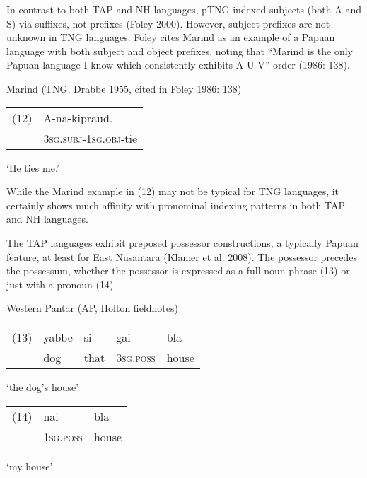 In contrast to both TAP and NH languages, pTNG indexed subjects (both A and S) via suffixes, not prefixes (Foley 2000). However, subject prefixes are not unknown in TNG languages. Foley cites Marind as an example of a Papuan language with both subject and object prefixes, noting that {\textquotedblleft}Marind is the only Papuan language I know which consistently exhibits A-U-V{\textquotedblright} order (1986: 138). 

Marind (TNG, Drabbe 1955, cited in Foley 1986: 138)

\begin{flushleft}
\tablehead{}
\begin{supertabular}{m{0.48795983in}m{1.5948598in}}
(12) &
A-na-kipraud.\\
 &
3\textsc{sg.subj-1sg.obj-}tie\\
\end{supertabular}
\end{flushleft}
{\textquoteleft}He ties me.{\textquoteright}  

While the Marind example in (12) may not be typical for TNG languages, it certainly shows much affinity with pronominal indexing patterns in both TAP and NH languages. 

The TAP languages exhibit preposed possessor constructions, a typically Papuan feature, at least for East Nusantara (Klamer et al. 2008). The possessor precedes the possessum, whether the possessor is expressed as a full noun phrase (13) or just with a pronoun (14).

Western Pantar (AP, Holton fieldnotes)

\begin{flushleft}
\tablehead{}
\begin{supertabular}{m{0.48795983in}m{0.51225984in}m{0.41295984in}m{0.8073598in}m{0.51295984in}}
(13) &
yabbe &
si &
gai &
bla\\
 &
dog &
that &
\textsc{3sg.poss} &
house\\
\end{supertabular}
\end{flushleft}
{\textquoteleft}the dog{\textquoteright}s house{\textquoteright} 

\begin{flushleft}
\tablehead{}
\begin{supertabular}{m{0.48795983in}m{0.8073598in}m{0.6108598in}}
 (14) &
nai &
bla\\
 &
\textsc{1sg.poss} &
house\\
\end{supertabular}
\end{flushleft}
 {\textquoteleft}my house{\textquoteright} 

